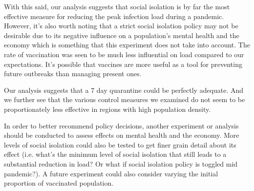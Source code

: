 \documentclass[12pt,a4paper]{article}
\begin{document}
With this said, our analysis suggests that social isolation is by far the most effective measure for reducing the peak infection load during a pandemic. However, it's also worth noting that a strict social isolation policy may not be desirable due to its negative influence on a population's mental health and the economy which is something that this experiment does not take into account. The rate of vaccination was seen to be much less influential on load compared to our expectations. It's possible that vaccines are more useful as a tool for preventing future outbreaks than managing present ones. 

Our analysis suggests that a 7 day quarantine could be perfectly adequate. And we further see that the various control measures we examined do not seem to be proportionately less effective in regions with high population density.

In order to better recommend policy decisions, another experiment or analysis should be conducted to assess effects on mental health and the economy. More levels of social isolation could also be tested to get finer grain detail about its effect (i.e. what's the minimum level of social isolation that still leads to a substantial reduction in load? Or what if social isolation policy is toggled mid pandemic?). A future experiment could also consider varying the initial proportion of vaccinated population.






\end{document}
